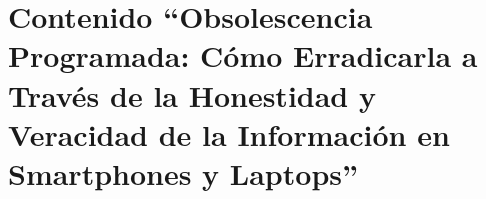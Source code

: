 \section{Contenido ``Obsolescencia Programada: Cómo Erradicarla a Través de la
    Honestidad y Veracidad de la Información en Smartphones y Laptops''}


\newpage


\newpage


\newpage


\newpage


\newpage
